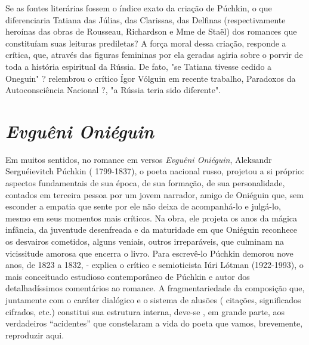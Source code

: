 Se as fontes literárias fossem o índice exato da criação de Púchkin, o
que diferenciaria Tatiana das Júlias, das Clarissas, das Delfinas
(respectivamente heroínas das obras de Rousseau, Richardson e Mme de
Staël) dos romances que constituíam suas leituras prediletas? A força
moral dessa criação, responde a crítica, que, através das figuras
femininas por ela geradas agiria sobre o porvir de toda a história
espiritual da Rússia. De fato, "se Tatiana tivesse cedido a Oneguin" ?
relembrou o crítico Ígor Vólguin em recente trabalho, Paradoxos da
Autoconsciência Nacional ?, "a Rússia teria sido diferente".

\chapter{\emph{Evguêni Oniéguin}}

Em muitos sentidos, no romance em versos \emph{Evguêni Oniéguin},
Aleksandr Serguéievitch Púchkin ( 1799-1837), o poeta nacional russo,
projetou a si próprio: aspectos fundamentais de sua época, de sua
formação, de sua personalidade, contados em terceira pessoa por um jovem
narrador, amigo de Oniéguin que, sem esconder a empatia que sente por
ele não deixa de acompanhá-lo e julgá-lo, mesmo em seus momentos mais
críticos. Na obra, ele projeta os anos da mágica infância, da juventude
desenfreada e da maturidade em que Oniéguin reconhece os desvairos
cometidos, alguns veniais, outros irreparáveis, que culminam na
vicissitude amorosa que encerra o livro. Para escrevê-lo Púchkin demorou
nove anos, de 1823 a 1832, - explica o crítico e semioticista Iúri
Lótman (1922-1993), o mais conceituado estudioso contemporâneo de
Púchkin e autor dos detalhadíssimos comentários ao romance. A
fragmentariedade da composição que, juntamente com o caráter dialógico e
o sistema de alusões ( citações, significados cifrados, etc.) constitui
sua estrutura interna, deve-se , em grande parte, aos verdadeiros
``acidentes'' que constelaram a vida do poeta que vamos, brevemente,
reproduzir aqui.


